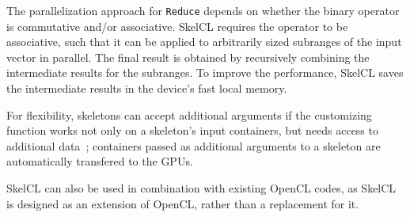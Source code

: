 %
% 
%
%
%


The parallelization approach for \texttt{Reduce} depends on whether the binary operator is commutative and/or associative.
SkelCL requires the operator to be associative, such that it can be applied to arbitrarily sized subranges of the input vector in parallel.
The final result is obtained by recursively combining the intermediate results for the subranges.
To improve the performance, SkelCL saves the intermediate results in the device's fast local memory.


For flexibility, \SkelCL skeletons can accept additional arguments if the customizing function works not only on a skeleton's input containers, but needs access to additional data~\cite{StKG-11};
containers passed as additional arguments to a skeleton are automatically transfered to the GPUs.

SkelCL can also be used in combination with existing OpenCL codes, as SkelCL is designed as an extension of OpenCL, rather than a replacement for it.


